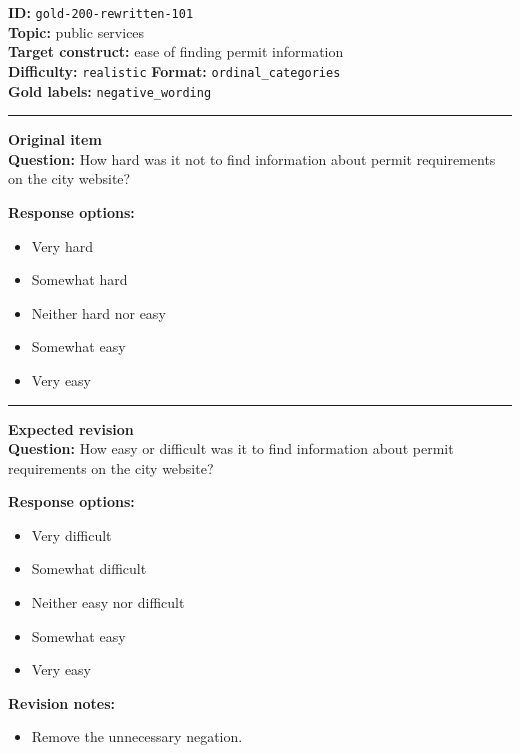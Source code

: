 \documentclass[10pt,a4paper]{article}
\newcommand{\sectionline}{\vspace{0.15em}\hrule\vspace{0.35em}}
\begin{document}
\begin{tcolorbox}[colframe=FlawRed,colback=white,colbacktitle=FlawRed!9,coltitle=black,title={Item 101\hfill Flawed item}]
\textbf{ID:} \texttt{gold-200-rewritten-101}\\
\textbf{Topic:} public services\\
\textbf{Target construct:} ease of finding permit information\\
\textbf{Difficulty:} \texttt{realistic} \quad \textbf{Format:} \texttt{ordinal\_categories}\\
\textbf{Gold labels:} \texttt{negative\_wording}\\
\sectionline
\textbf{Original item}\\
\textbf{Question:} How hard was it not to find information about permit requirements on the city website?
\par\textbf{Response options:}
\begin{itemize}
\item Very hard
\item Somewhat hard
\item Neither hard nor easy
\item Somewhat easy
\item Very easy
\end{itemize}
\sectionline
\textbf{Expected revision}\\
\textbf{Question:} How easy or difficult was it to find information about permit requirements on the city website?
\par\textbf{Response options:}
\begin{itemize}
\item Very difficult
\item Somewhat difficult
\item Neither easy nor difficult
\item Somewhat easy
\item Very easy
\end{itemize}
\par\textbf{Revision notes:}
\begin{itemize}
\item Remove the unnecessary negation.
\end{itemize}
\end{tcolorbox}
\end{document}
